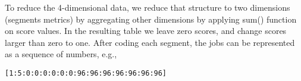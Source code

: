 \documentclass{jhps}
\begin{document}

To reduce the 4-dimensional data, we reduce that structure to two dimensions (segments metrics) by aggregating other dimensions by applying sum() function on score values.
In the resulting table we leave zero scores, and change scores larger than zero to one.
After coding each segment, the jobs can be represented as a sequence of numbers, e.g.,

\begin{lstlisting}[caption={Binary coding of a 15 segments long job.}]
[1:5:0:0:0:0:0:0:96:96:96:96:96:96:96]
\end{lstlisting}
\end{document}
